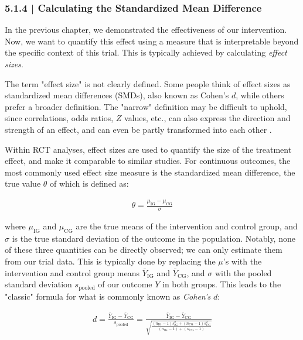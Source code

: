 \subsubsection{{\normalfont\textsf{\textcolor{sBlue}{\small 5.1.4 |}}} Calculating the Standardized Mean Difference}

In the previous chapter, we demonstrated the effectiveness of our intervention. Now, we want to quantify this effect using a measure that is interpretable beyond the specific context of this trial. This is typically achieved by calculating \emph{effect sizes}. 

The term "effect size" is not clearly defined. Some people think of effect sizes as standardized mean differences (SMDs), also known as Cohen's $d$, while others prefer a broader definition. The "narrow" definition may be difficult to uphold, since correlations, odds ratios, $Z$ values, etc., can also express the direction and strength of an effect, and can even be partly transformed into each other \citep[][chap. 3.1]{harrer2021doing}.

Within RCT analyses, effect sizes are used to quantify the size of the treatment effect, and make it comparable to similar studies. For continuous outcomes, the most commonly used effect size measure is the standardized mean difference, the true value $\theta$ of which is defined as:

\begin{align}
\theta = \frac{\mu_{\text{IG}}-\mu_{\text{CG}}}{\sigma}
\end{align}

where $\mu_{\text{IG}}$ and $\mu_{\text{CG}}$ are the true means of the intervention and control group, and $\sigma$ is the true standard deviation of the outcome in the population. Notably, none of these three quantities can be directly observed; we can only estimate them from our trial data. This is typically done by replacing the $\mu$'s with the intervention and control group means $\bar Y_{\text{IG}}$ and $\bar Y_{\text{CG}}$, and $\sigma$ with the pooled standard deviation $s_{\text{pooled}}$ of our outcome $Y$ in both groups. This leads to the "classic" formula for what is commonly known as \emph{Cohen's} $d$: 

\begin{align}
\label{eq:cohen_d}
d = \frac{\bar Y_{\text{IG}}- \bar Y_{\text{CG}}}{s_{\text{pooled}}} = \frac{\bar Y_{\text{IG}}- \bar Y_{\text{CG}}}{\displaystyle \sqrt{\frac{(n_{\text{IG}}-1)s^2_{\text{IG}}+(n_{\text{CG}}-1)s^2_{\text{CG}}}{(n_{\text{IG}}-1)+(n_{\text{CG}}-1)}}}
\end{align}

